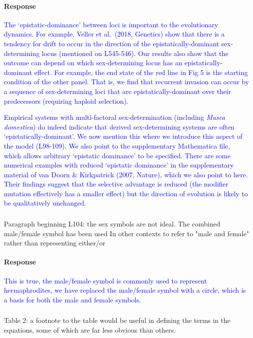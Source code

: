 \documentclass[10pt,letterpaper]{article}
\begin{document}
\noindent\paragraph{Response}
\textcolor{blue}{
The `epistatic-dominance' between loci is important to the evolutionary dynamics. For example, Veller et al.\ (2018, Genetics) show that there is a tendency for drift to occur in the direction of the epistatically-dominant sex-determining locus (mentioned on L545-546). Our results also show that the outcome can depend on which sex-determining locus has an epistatically-dominant effect. For example, the end state of the red line in Fig 5 is the starting condition of the other panel. That is, we find that recurrent invasion can occur by a sequence of sex-determining loci that are epistatically-dominant over their predecessors (requiring haploid selection). 
 }
 
\textcolor{blue}{
Empirical systems with multi-factoral sex-determination (including \textit{Musca domestica}) do indeed indicate that derived sex-determining systems are often `epistatically-dominant'. 
We now mention this where we introduce this aspect of the model (L98-109). 
We also point to the supplementary Mathematica file, which allows arbitrary `epistatic dominance' to be specified. 
There are some numerical examples with reduced `epistatic dominance' in the supplementary material of van Doorn \& Kirkpatrick (2007, Nature), which we also point to here.
Their findings suggest that the selective advantage is reduced (the modifier mutation effectively has a smaller effect) but the direction of evolution is likely to be qualitatively unchanged. 
}

\noindent\subsubsection{}
Paragraph beginning L104: the sex symbols are not ideal. The combined male/female symbol has been used In other contexts to refer to "male and female" rather than representing either/or

\noindent\paragraph{Response}
\textcolor{blue}{This is true, the male/female symbol is commonly used to represent hermaphrodites, we have replaced the male/female symbol with a circle, which is a basis for both the male and female symbols.}

\noindent\subsubsection{}
Table 2: a footnote to the table would be useful in defining the terms in the equations, some of which are far less obvious than others.
\end{document}
